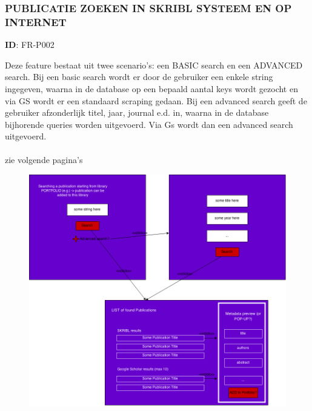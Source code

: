\documentclass{article}
\begin{document}
\subsubsection*{PUBLICATIE ZOEKEN IN SKRIBL SYSTEEM EN OP INTERNET}
\vspace{2 mm}

\textbf{ID}: FR-P002
\vspace{2 mm}


\noindent Deze feature bestaat uit twee scenario's: een BASIC search en een ADVANCED search. Bij een basic search wordt er door de gebruiker een enkele string ingegeven, waarna in de database op een bepaald aantal keys wordt gezocht en via GS wordt er een standaard scraping gedaan. Bij een advanced search geeft de gebruiker afzonderlijk titel, jaar, journal e.d. in, waarna in de database bijhorende queries worden uitgevoerd. Via Gs wordt dan een advanced search uitgevoerd. 
\\
\\
zie volgende pagina's

\begin{figure}[h]
    \includegraphics[width = 16cm]{basic-advanced-search.png}
\end{figure}

\clearpage
\end{document}
